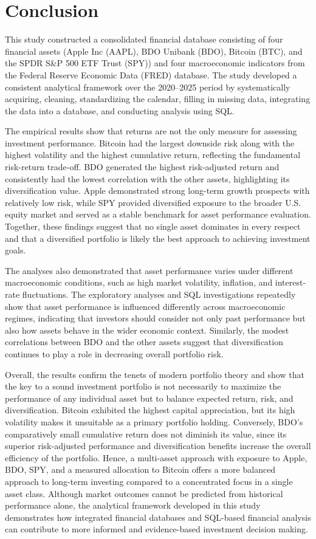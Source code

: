 \section{Conclusion}

This study constructed a consolidated financial database consisting of four financial assets (Apple Inc (AAPL), BDO Unibank (BDO), Bitcoin (BTC), and the SPDR S\&P 500 ETF Trust (SPY)) and four macroeconomic indicators from the Federal Reserve Economic Data (FRED) database. The study developed a consistent analytical framework over the 2020--2025 period by systematically acquiring, cleaning, standardizing the calendar, filling in missing data, integrating the data into a database, and conducting analysis using SQL.

The empirical results show that returns are not the only measure for assessing investment performance. Bitcoin had the largest downside risk along with the highest volatility and the highest cumulative return, reflecting the fundamental risk-return trade-off. BDO generated the highest risk-adjusted return and consistently had the lowest correlation with the other assets, highlighting its diversification value. Apple demonstrated strong long-term growth prospects with relatively low risk, while SPY provided diversified exposure to the broader U.S. equity market and served as a stable benchmark for asset performance evaluation. Together, these findings suggest that no single asset dominates in every respect and that a diversified portfolio is likely the best approach to achieving investment goals.

The analyses also demonstrated that asset performance varies under different macroeconomic conditions, such as high market volatility, inflation, and interest-rate fluctuations. The exploratory analyses and SQL investigations repeatedly show that asset performance is influenced differently across macroeconomic regimes, indicating that investors should consider not only past performance but also how assets behave in the wider economic context. Similarly, the modest correlations between BDO and the other assets suggest that diversification continues to play a role in decreasing overall portfolio risk.

Overall, the results confirm the tenets of modern portfolio theory and show that the key to a sound investment portfolio is not necessarily to maximize the performance of any individual asset but to balance expected return, risk, and diversification. Bitcoin exhibited the highest capital appreciation, but its high volatility makes it unsuitable as a primary portfolio holding. Conversely, BDO's comparatively small cumulative return does not diminish its value, since its superior risk-adjusted performance and diversification benefits increase the overall efficiency of the portfolio. Hence, a multi-asset approach with exposure to Apple, BDO, SPY, and a measured allocation to Bitcoin offers a more balanced approach to long-term investing compared to a concentrated focus in a single asset class. Although market outcomes cannot be predicted from historical performance alone, the analytical framework developed in this study demonstrates how integrated financial databases and SQL-based financial analysis can contribute to more informed and evidence-based investment decision making.
